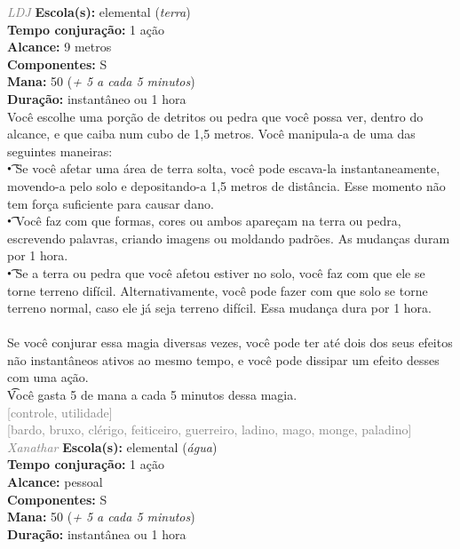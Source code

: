 \documentclass{RPG_Adventure}[2021/10/20]
\begin{document}
{\tiny \textcolor{gray}{\textit{LDJ}}}
{\small \t \textbf{Escola(s):} elemental (\textit{terra})\\\t \textbf{Tempo conjuração:} 1 ação\\\t \textbf{Alcance:} 9 metros\\\t \textbf{Componentes:} S\\\t \textbf{Mana:} 50 (\textit{+ 5 a cada 5 minutos})\\\t \textbf{Duração:} instantâneo ou 1 hora\\}
{\normalsize Você escolhe uma porção de detritos ou pedra que você possa ver, dentro do alcance, e que caiba num cubo de 1,5 metros. Você manipula-a de uma das seguintes maneiras: \\\t • Se você afetar uma área de terra solta, você pode escava-la instantaneamente, movendo-a pelo solo e depositando-a 1,5 metros de distância. Esse momento não tem força suficiente para causar dano.\\\t • Você faz com que formas, cores ou ambos apareçam na terra ou pedra, escrevendo palavras, criando imagens ou moldando padrões. As mudanças duram por 1 hora.\\\t • Se a terra ou pedra que você afetou estiver no solo, você faz com que ele se torne terreno difícil. Alternativamente, você pode fazer com que solo se torne terreno normal, caso ele já seja terreno difícil. Essa mudança dura por 1 hora.\\\\Se você conjurar essa magia diversas vezes, você pode ter até dois dos seus efeitos não instantâneos ativos ao mesmo tempo, e você pode dissipar um efeito desses com uma ação.\\\t Você gasta 5 de mana a cada 5 minutos dessa magia.\\}
{\scriptsize \textcolor{gray}{[controle, utilidade]\\}}
{\scriptsize \textcolor{gray}{[bardo, bruxo, clérigo, feiticeiro, guerreiro, ladino, mago, monge, paladino]\\}}
{\tiny \textcolor{gray}{\textit{Xanathar}}}
{\small \t \textbf{Escola(s):} elemental (\textit{água})\\\t \textbf{Tempo conjuração:} 1 ação\\\t \textbf{Alcance:} pessoal\\\t \textbf{Componentes:} S\\\t \textbf{Mana:} 50 (\textit{+ 5 a cada 5 minutos})\\\t \textbf{Duração:} instantânea ou 1 hora\\}
\end{document}
